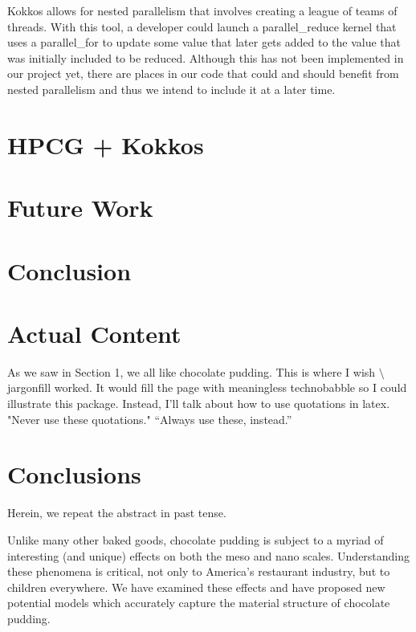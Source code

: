 \documentclass{ccr15}
\begin{document}
Kokkos allows for nested parallelism that involves creating a league of teams of threads.
With this tool, a developer could launch a parallel\_reduce kernel that uses a parallel\_for to
update some value that later gets added to the value that was initially included to be reduced.
Although this has not been implemented in our project yet, there are places in our code that
could and should benefit from nested parallelism and thus we intend to include it at a later
time.

\section{HPCG + Kokkos}

\section{Future Work}

\section{Conclusion}

\section{Actual Content}

As we saw in Section 1, we all like chocolate pudding. This is where I wish
\textsf{$\setminus$jargonfill} worked. It would fill the page with meaningless technobabble so I could illustrate this
package. Instead, I'll talk about how to use quotations in latex. "Never use these quotations." ``Always use these,
instead.''

\section{Conclusions}
Herein, we repeat the abstract in past tense.

Unlike many other baked goods, chocolate pudding is subject to a myriad of interesting (and unique) effects on both the
meso and nano scales.  Understanding these phenomena is critical, not only to America's restaurant industry, but to
children everywhere.  We have examined these effects and have proposed new potential models which accurately capture
the material structure of chocolate pudding.


\nocite{ZAB:Mentor05}


%
\end{document}

